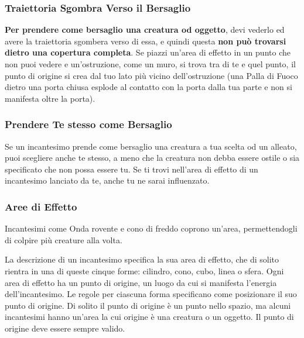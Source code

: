 \begin{multicols}{2}
\subsubsection*{Traiettoria Sgombra Verso il Bersaglio}

\textbf{Per prendere come bersaglio una creatura od oggetto}, devi vederlo ed avere la traiettoria sgombera verso di essa, e quindi questa \textbf{non può trovarsi dietro una copertura completa}. Se piazzi un'area di effetto in un punto che non puoi vedere e un'ostruzione, come un muro, si trova tra di te e quel punto, il punto di origine si crea dal tuo lato più vicino dell'ostruzione (una Palla di Fuoco dietro una porta chiusa esplode al contatto con la porta dalla tua parte e non si manifesta oltre la porta).

\subsubsection*{Prendere Te stesso come Bersaglio}

Se un incantesimo prende come bersaglio una creatura a tua scelta od un alleato, puoi scegliere anche te stesso, a meno che la creatura non debba essere ostile o sia specificato che non possa essere tu. Se ti trovi nell'area di effetto di un incantesimo lanciato da te, anche tu ne sarai influenzato.

\subsubsection{Aree di Effetto}\label{magieareedieffetto}

Incantesimi come Onda rovente e cono di freddo coprono un'area, permettendogli di colpire più creature alla volta.

La descrizione di un incantesimo specifica la sua area di effetto, che di solito rientra in una di queste cinque forme: cilindro, cono, cubo, linea o sfera. Ogni area di effetto ha un punto di origine, un luogo da cui si manifesta l'energia dell'incantesimo. Le regole per ciascuna forma specificano come posizionare il suo punto di origine. Di solito il punto di origine è un punto nello spazio, ma alcuni incantesimi hanno un'area la cui origine è una creatura o un oggetto. Il punto di origine deve essere sempre valido.


\end{multicols}
